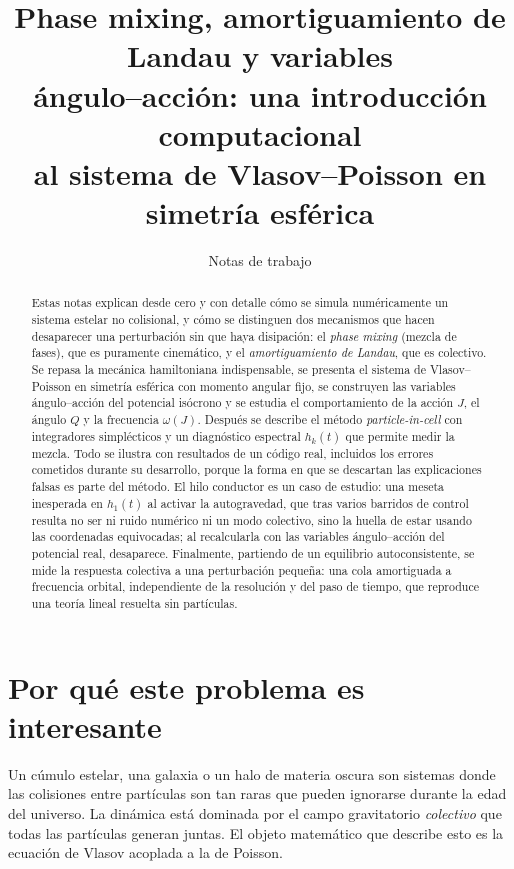 \documentclass[11pt,a4paper]{article}
\title{\bfseries Phase mixing, amortiguamiento de Landau y variables\\
       ángulo--acción: una introducción computacional\\
       al sistema de Vlasov--Poisson en simetría esférica}
\author{Notas de trabajo}
\date{}
\theoremstyle{definition}
\begin{document}
\maketitle

\begin{abstract}
\noindent
Estas notas explican desde cero y con detalle cómo se simula numéricamente un
sistema estelar no colisional, y cómo se distinguen dos mecanismos que hacen
desaparecer una perturbación sin que haya disipación: el \emph{phase mixing}
(mezcla de fases), que es puramente cinemático, y el \emph{amortiguamiento de
Landau}, que es colectivo. Se repasa la mecánica hamiltoniana indispensable, se
presenta el sistema de Vlasov--Poisson en simetría esférica con momento angular
fijo, se construyen las variables ángulo--acción del potencial isócrono y se
estudia el comportamiento de la acción $J$, el ángulo $Q$ y la frecuencia
$\omega(J)$. Después se describe el método \emph{particle-in-cell} con
integradores simplécticos y un diagnóstico espectral $h_k(t)$ que permite medir
la mezcla. Todo se ilustra con resultados de un código real, incluidos los errores
cometidos durante su desarrollo, porque la forma en que se descartan las
explicaciones falsas es parte del método. El hilo conductor es un caso de estudio:
una meseta inesperada en $h_1(t)$ al activar la autogravedad, que tras varios
barridos de control resulta no ser ni ruido numérico ni un modo colectivo, sino la
huella de estar usando las coordenadas equivocadas; al recalcularla con las
variables ángulo--acción del potencial real, desaparece. Finalmente, partiendo de un
equilibrio autoconsistente, se mide la respuesta colectiva a una perturbación pequeña:
una cola amortiguada a frecuencia orbital, independiente de la resolución y del paso de
tiempo, que reproduce una teoría lineal resuelta sin partículas.
\end{abstract}

\tableofcontents
\bigskip

\section{Por qué este problema es interesante}

Un cúmulo estelar, una galaxia o un halo de materia oscura son sistemas donde las
colisiones entre partículas son tan raras que pueden ignorarse durante la edad del
universo. La dinámica está dominada por el campo gravitatorio \emph{colectivo} que
todas las partículas generan juntas. El objeto matemático que describe esto es la
ecuación de Vlasov acoplada a la de Poisson.
\end{document}
